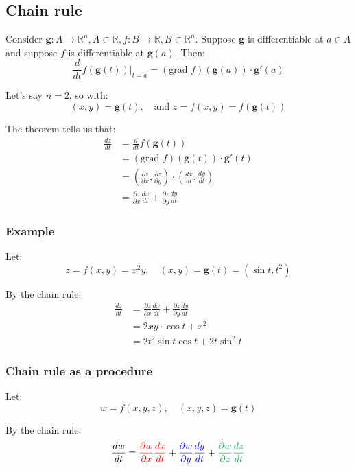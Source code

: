 \documentclass[11pt]{article}
\begin{document}
\subsection{Chain rule}
\label{sec:orgddf4240}
Consider \(\boldsymbol{g} : A \rightarrow \mathbb{R}^n, A \subset \mathbb{R}, f : B \rightarrow \mathbb{R}, B \subset \mathbb{R}^n\). Suppose \(\boldsymbol{g}\) is differentiable at \(a \in A\) and suppose \(f\) is differentiable at \(\boldsymbol{g}(a)\). Then:
\[\frac{d}{dt} f(\boldsymbol{g}(t))|_{t = a} = (\text{grad } f)(\boldsymbol{g}(a)) \cdot \boldsymbol{g}'(a)\]

Let's say \(n = 2\), so with:
\[(x, y) = \boldsymbol{g}(t), \quad \text{and } z = f(x, y) = f(\boldsymbol{g}(t))\]

The theorem tells us that:
\begin{align*}
\frac{dz}{dt} &= \frac{d}{dt}f(\boldsymbol{g}(t)) \\
&= (\text{grad } f)(\boldsymbol{g}(t)) \cdot \boldsymbol{g}'(t) \\
&= \left(\frac{\partial z}{\partial x}, \frac{\partial z}{\partial y} \right) \cdot \left( \frac{dx}{dt}, \frac{dy}{dt} \right) \\
&= \frac{\partial z}{\partial x} \frac{dx}{dt} + \frac{\partial z}{\partial y} \frac{dy}{dt}
\end{align*}

\subsubsection{Example}
\label{sec:org51c64b7}
Let:
\[z = f(x, y) = x^2 y, \quad (x, y) = \boldsymbol{g}(t) = (\sin t, t^2)\]

By the chain rule:
\begin{align*}
\frac{dz}{dt} &= \frac{\partial z}{\partial x} \frac{dx}{dt} + \frac{\partial z}{\partial y} \frac{dy}{dt} \\
&= 2xy \cdot \cos t + x^2 \\
&= 2t^2 \sin t \cos t + 2t \sin^2 t
\end{align*}

\newpage

\subsubsection{Chain rule as a procedure}
\label{sec:org067a5e5}
Let:
\[w = f(x, y, z), \quad (x, y, z) = \boldsymbol{g}(t)\]

By the chain rule:
\[\frac{dw}{dt} = \textcolor{red}{\frac{\partial w}{\partial x} \frac{dx}{dt}} + \textcolor{blue}{\frac{\partial w}{\partial y} \frac{dy}{dt}} + \textcolor{ForestGreen}{\frac{\partial w}{\partial z} \frac{dz}{dt}}\]
\end{document}
